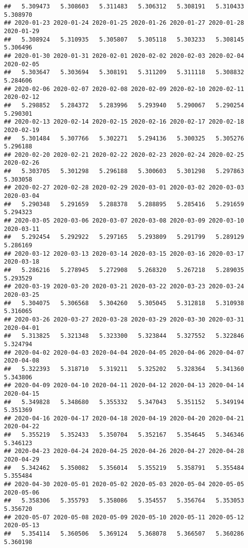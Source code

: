 \documentclass[
]{article}
\begin{document}
\begin{verbatim}
##   5.309473   5.308603   5.311483   5.306312   5.308191   5.310433   5.308970 
## 2020-01-23 2020-01-24 2020-01-25 2020-01-26 2020-01-27 2020-01-28 2020-01-29 
##   5.308924   5.310935   5.305807   5.305118   5.303233   5.308145   5.306496 
## 2020-01-30 2020-01-31 2020-02-01 2020-02-02 2020-02-03 2020-02-04 2020-02-05 
##   5.303647   5.303694   5.308191   5.311209   5.311118   5.308832   5.284606 
## 2020-02-06 2020-02-07 2020-02-08 2020-02-09 2020-02-10 2020-02-11 2020-02-12 
##   5.298852   5.284372   5.283996   5.293940   5.290067   5.290254   5.290301 
## 2020-02-13 2020-02-14 2020-02-15 2020-02-16 2020-02-17 2020-02-18 2020-02-19 
##   5.301484   5.307766   5.302271   5.294136   5.300325   5.305276   5.296188 
## 2020-02-20 2020-02-21 2020-02-22 2020-02-23 2020-02-24 2020-02-25 2020-02-26 
##   5.303705   5.301298   5.296188   5.300603   5.301298   5.297863   5.303058 
## 2020-02-27 2020-02-28 2020-02-29 2020-03-01 2020-03-02 2020-03-03 2020-03-04 
##   5.290348   5.291659   5.288378   5.288895   5.285416   5.291659   5.294323 
## 2020-03-05 2020-03-06 2020-03-07 2020-03-08 2020-03-09 2020-03-10 2020-03-11 
##   5.292454   5.292922   5.297165   5.293809   5.291799   5.289129   5.286169 
## 2020-03-12 2020-03-13 2020-03-14 2020-03-15 2020-03-16 2020-03-17 2020-03-18 
##   5.286216   5.278945   5.272908   5.268320   5.267218   5.289035   5.293529 
## 2020-03-19 2020-03-20 2020-03-21 2020-03-22 2020-03-23 2020-03-24 2020-03-25 
##   5.304075   5.306568   5.304260   5.305045   5.312818   5.310938   5.316065 
## 2020-03-26 2020-03-27 2020-03-28 2020-03-29 2020-03-30 2020-03-31 2020-04-01 
##   5.313825   5.321348   5.323300   5.323844   5.327552   5.322846   5.324794 
## 2020-04-02 2020-04-03 2020-04-04 2020-04-05 2020-04-06 2020-04-07 2020-04-08 
##   5.322393   5.318710   5.319211   5.325202   5.328364   5.341360   5.343806 
## 2020-04-09 2020-04-10 2020-04-11 2020-04-12 2020-04-13 2020-04-14 2020-04-15 
##   5.349828   5.348680   5.355332   5.347043   5.351152   5.349194   5.351369 
## 2020-04-16 2020-04-17 2020-04-18 2020-04-19 2020-04-20 2020-04-21 2020-04-22 
##   5.355219   5.352433   5.350704   5.352167   5.354645   5.346346   5.346123 
## 2020-04-23 2020-04-24 2020-04-25 2020-04-26 2020-04-27 2020-04-28 2020-04-29 
##   5.342462   5.350082   5.356014   5.355219   5.358791   5.355484   5.355484 
## 2020-04-30 2020-05-01 2020-05-02 2020-05-03 2020-05-04 2020-05-05 2020-05-06 
##   5.358306   5.355793   5.358086   5.354557   5.356764   5.353053   5.356720 
## 2020-05-07 2020-05-08 2020-05-09 2020-05-10 2020-05-11 2020-05-12 2020-05-13 
##   5.354114   5.360506   5.369124   5.368078   5.366507   5.360286   5.360198 

\end{verbatim}
\end{document}
